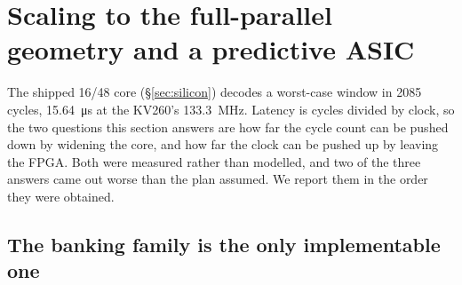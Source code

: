 
\section{Scaling to the full-parallel geometry and a predictive ASIC}
\label{sec:scaling}

The shipped 16/48 core (\S\ref{sec:silicon}) decodes a worst-case window in 2085
cycles, \SI{15.64}{\micro\second} at the KV260's \SI{133.3}{\mega\hertz}.
Latency is cycles divided by clock, so the two questions this section answers
are how far the cycle count can be pushed down by widening the core, and how
far the clock can be pushed up by leaving the FPGA. Both were measured rather
than modelled, and two of the three answers came out worse than the plan
assumed. We report them in the order they were obtained.

\subsection*{The banking family is the only implementable one}


